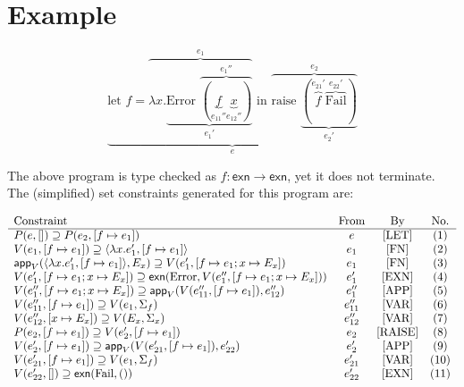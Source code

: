 \documentclass{article}
\begin{document}
\section{Example}

\[
\underbrace{\text{let }f = \overbrace{\lambda x.\underbrace{\text{Error } \overbrace{(\underbrace{f}_{e_{11}''} \underbrace{x}_{e_{12}''})}^{e_{1}''}}_{e_{1}'}}^{e_{1}}\text{ in }\overbrace{\text{raise } \underbrace{(\overbrace{f}^{e_{21}'} \overbrace{\text{Fail}}^{e_{22}'})}_{e_{2}'}}^{e_{2}}}_{e}
\]

The above program is type checked as $f:\mathsf{exn}\rightarrow \mathsf{exn}$, yet it does not terminate. The (simplified) set constraints generated for this program are:

\[
\begin{array}{l c c c}
  \text{Constraint} & \text{From} & \text{By} & \text{No.}\\
  \hline
  P(e, []) \supseteq P(e_{2},[f\mapsto e_{1}]) & e & \text{[LET]} & (1)\\
  V(e_{1},[f\mapsto e_{1}]) \supseteq \langle \lambda x.e_{1}' , [f \mapsto e_{1}]\rangle & e_{1} & \text{[FN]} & (2)\\
  \mathsf{app}_{V}(\langle \lambda x.e_{1}' , [f \mapsto e_{1}]\rangle, E_{x}) \supseteq V(e_{1}',[f \mapsto e_{1};x \mapsto E_{x}]) & e_{1} & \text{[FN]} & (3)\\
  V(e_{1}',[f \mapsto e_{1};x \mapsto E_{x}]) \supseteq \mathsf{exn}(\text{Error},V(e_{1}'', [f \mapsto e_{1};x \mapsto E_{x}])) & e_{1}' & \text{[EXN]} & (4)\\
  V(e_{1}'',[f \mapsto e_{1};x \mapsto E_{x}]) \supseteq \mathsf{app}_{V}(V(e_{11}'', [f \mapsto e_{1}]), e_{12}'') & e_{1}'' & \text{[APP]} & (5)\\
  V(e_{11}'', [f \mapsto e_{1}]) \supseteq V(e_{1},\Sigma_{f}) & e_{11}'' & \text{[VAR]} & (6)\\
  V(e_{12}'', [x \mapsto E_{x}]) \supseteq V(E_{x},\Sigma_{x}) & e_{12}'' & \text{[VAR]} & (7)\\
  P(e_{2},[f \mapsto e_{1}]) \supseteq V(e_{2}',[f \mapsto e_{1}]) & e_{2} & \text{[RAISE]} & (8)\\
  V(e_{2}', [f \mapsto e_{1}]) \supseteq \mathsf{app}_{V}(V(e_{21}', [f \mapsto e_{1}]), e_{22}') & e_{2}' & \text{[APP]} & (9)\\
  V(e_{21}', [f \mapsto e_{1}]) \supseteq V(e_{1},\Sigma_{f}) & e_{21}' & \text{[VAR]} & (10)\\
  V(e_{22}', []) \supseteq \mathsf{exn}(\text{Fail}, ()) & e_{22}' & \text{[EXN]} & (11)
\end{array}
\]
\end{document}

